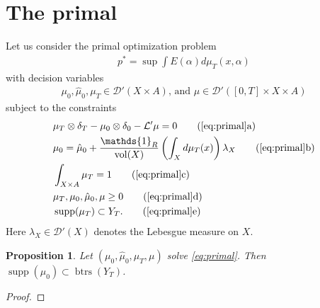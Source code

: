 \documentclass[12pt]{amsart}
\DeclareMathOperator{\vol}{vol}
\DeclareMathOperator{\supp}{supp}
\DeclareMathOperator{\btrs}{btrs}
\newtheorem{prop}[thm]{Proposition}
\begin{document}
\section{The primal}
Let us consider the primal optimization problem
\begin{align}
	p^* = \sup \int E(\alpha) d\mu_T(x,\alpha)  \label{eq:primal}
\end{align}
with decision variables
\begin{align*}
	\mu_0,\hat{\mu}_0,\mu_T \in \mathcal{D}'(X \times A) \text{, and } \mu \in \mathcal{D}'( [0,T] \times X \times A)
\end{align*}
subject to the constraints
\begin{align}
	&\mu_T \otimes \delta_T - \mu_0 \otimes \delta_0 - \mathcal{L}' \mu = 0 \tag{\ref{eq:primal}a} \label{LE constraint} \\
	&\mu_0 = \hat{\mu}_0 + \frac{ \mathds{1}_R}{ \vol(X) } \left( \int_X d\mu_T (x) \right) \lambda_X \tag{\ref{eq:primal}b} \label{robustness constraint} \\
	&\int_{X\times A} \mu_T = 1 \tag{\ref{eq:primal}c} \label{normalization constraint}\\
	&\mu_T, \mu_0 , \hat{\mu}_0 , \mu \geq 0 \tag{\ref{eq:primal}d} \label{positivity constraint} \\
	&\supp( \mu_T) \subset Y_T . \label{support constraint} \tag{\ref{eq:primal}e} 
\end{align}
Here $\lambda_X \in \mathcal{D}'( X)$ denotes the Lebesgue measure on $X$.

\begin{prop} \label{prop:mu_0}
	Let $(\mu_0,\hat{\mu}_0,\mu_T,\mu)$ solve \eqref{eq:primal}.
	Then $\supp(\mu_0) \subset \btrs(Y_T)$.
\end{prop}
\begin{proof}
\end{proof}
\end{document}
